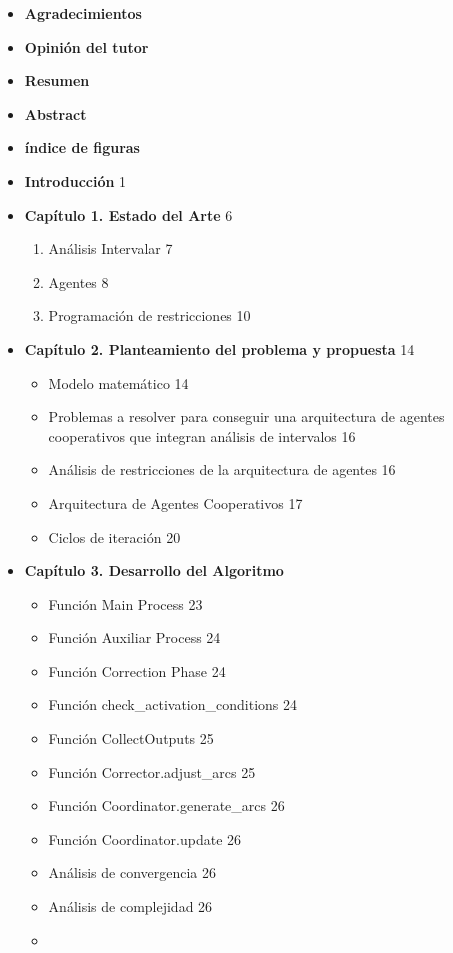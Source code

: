 \tableofcontents

\begin{itemize}
\item  \textbf{Agradecimientos} 
\item \textbf{Opinión del tutor}
\item \textbf{Resumen} 
\item \textbf{Abstract} 
\item \textbf{índice de figuras} 
\item \textbf{Introducción} \hfill 1
\item \textbf{ Capítulo 1. Estado del Arte} \hfill 6
\begin{enumerate}
    \item Análisis Intervalar \hfill 7
    \item Agentes \hfill 8
    \item Programación de restricciones \hfill 10
\end{enumerate}    

\item \textbf{ Capítulo 2. Planteamiento del problema y
propuesta} \hfill 14
\begin{itemize}
    \item Modelo matemático \hfill 14
    \item Problemas a resolver para conseguir una arquitectura de
    agentes cooperativos que integran análisis de intervalos \hfill 16
    \item Análisis de restricciones de la arquitectura de agentes \hfill 16
    \item Arquitectura de Agentes Cooperativos \hfill 17
    \item Ciclos de iteración \hfill 20
\end{itemize}

\item \textbf{ Capítulo 3. Desarrollo del Algoritmo}
\begin{itemize}
    \item Función Main Process \hfill 23
    \item Función Auxiliar Process \hfill 24
    \item Función Correction Phase \hfill 24
    \item Función check_activation_conditions \hfill 24
    \item Función CollectOutputs \hfill 25
    \item Función Corrector.adjust_arcs \hfill 25
    \item Función Coordinator.generate_arcs \hfill 26
    \item Función Coordinator.update \hfill 26
    \item Análisis de convergencia \hfill 26
    \item Análisis de complejidad \hfill 26
    \item 
\end{itemize}


\end{itemize}
